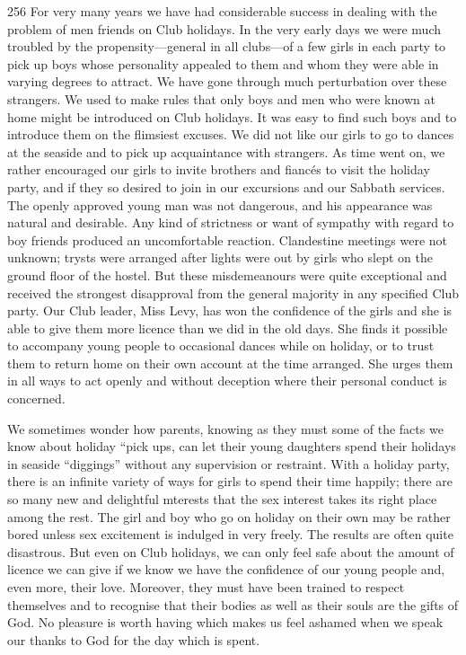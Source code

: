 \begin{tp}{256}
For very many years we have had considerable success
in dealing with the problem of men friends on Club holidays.
In the very early days we were much troubled by
the propensity—general in all clubs—of a few girls in
each party to pick up boys whose personality appealed to
them and whom they were able in varying degrees to
attract. We have gone through much perturbation over
these strangers. We used to make rules that only boys
and men who were known at home might be introduced
on Club holidays. It was easy to find such boys and to
introduce them on the flimsiest excuses. We did not like
our girls to go to dances at the seaside and to pick up
acquaintance with strangers. As time went on, we rather
encouraged our girls to invite brothers and fiancés to visit
the holiday party, and if they so desired to join in our
excursions and our Sabbath services. The openly
approved young man was not dangerous, and his
appearance was natural and desirable. Any kind of strictness or
want of sympathy with regard to boy friends produced an
uncomfortable reaction. Clandestine meetings were not
unknown; trysts were arranged after lights were out by
girls who slept on the ground floor of the hostel. But
these misdemeanours were quite exceptional and received
the strongest disapproval from the general majority in
any specified Club party. Our Club leader, Miss Levy,
has won the confidence of the girls and she is able to give
them more licence than we did in the old days. She finds
it possible to accompany young people to occasional
dances while on holiday, or to trust them to return home
on their own account at the time arranged. She urges
them in all ways to act openly and without deception
where their personal conduct is concerned.
\end{tp}

We sometimes wonder how parents, knowing as they
must some of the facts we know about holiday “pick
ups, can let their young daughters spend their holidays
in seaside “diggings” without any supervision or
restraint. With a holiday party, there is an infinite variety
of ways for girls to spend their time happily; there are
so many new and delightful mterests that the sex interest
takes its right place among the rest. The girl and boy
who go on holiday on their own may be rather bored
unless sex excitement is indulged in very freely. The
results are often quite disastrous. But even on Club
holidays, we can only feel safe about the amount of licence
we can give if we know we have the confidence of our
young people and, even more, their love. Moreover, they
must have been trained to respect themselves and to
recognise that their bodies as well as their souls are the
gifts of God. No pleasure is worth having which makes
us feel ashamed when we speak our thanks to God for
the day which is spent.

